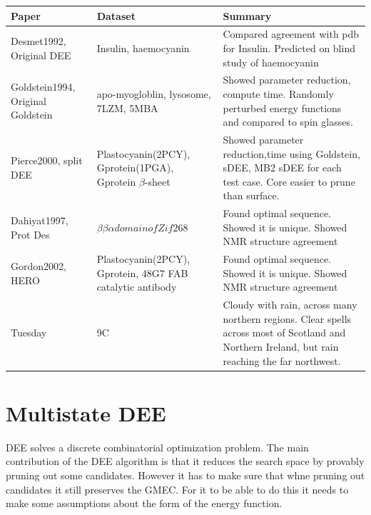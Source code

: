 \documentclass{article}
\begin{document}
\begin{center}
    \begin{tabular}{ | p{3cm} | p{3cm} | p{6cm} |}
    \hline
    \textbf{Paper} & \textbf{Dataset} & \bf{Summary} \\ \hline

    Desmet1992, Original DEE~\cite{Desmet1992} & Insulin, haemocyanin & Compared agreement with pdb for Insulin. Predicted on blind study of haemocyanin \\ \hline

    Goldstein1994, Original Goldstein~\cite{Goldstein1994} & apo-myogloblin, lysosome, 7LZM, 5MBA& Showed parameter reduction, compute time. Randomly perturbed energy functions and compared to spin glasses. \\ \hline

Pierce2000, split DEE~\cite{Pierce2000} & Plastocyanin(2PCY), Gprotein(1PGA), Gprotein $\beta$-sheet& Showed parameter reduction,time using Goldstein, sDEE, MB2 sDEE for each test case. Core easier to prune than surface. \\ \hline

Dahiyat1997, Prot Des~\cite{Dahiyat1997} & $\beta\beta\alpha domain of Zif268$ & Found optimal sequence. Showed it is unique. Showed NMR structure agreement \\ \hline

Gordon2002, HERO~\cite{Gordon2003} & Plastocyanin(2PCY), Gprotein, 48G7 FAB catalytic antibody & Found optimal sequence. Showed it is unique. Showed NMR structure agreement \\ \hline

    Tuesday & 9C & Cloudy with rain, across many northern regions. Clear spells
    across most of Scotland and Northern Ireland,
    but rain reaching the far northwest. \\ 
    \hline
    \end{tabular}
\end{center}


\section{Multistate DEE}
DEE solves a discrete combinatorial optimization problem. The main contribution of the DEE algorithm is that it reduces the search space by provably pruning out some candidates. However it has to make sure that whne pruning out candidates it still preserves the GMEC. For it to be able to do this it needs to make some assumptions about the form of the energy function. 
\end{document}
